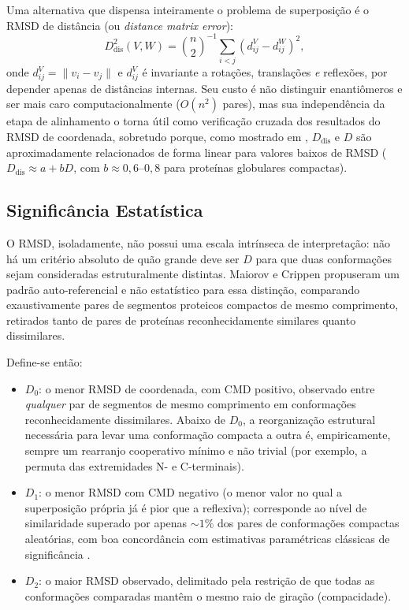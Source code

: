 \documentclass[12pt, a4paper]{article}
\theoremstyle{plain}
\theoremstyle{definition}
\theoremstyle{remark}
\newcommand{\ident}{\hspace{2em}}
\begin{document}
\ident Uma alternativa que dispensa inteiramente o problema de superposição é o RMSD de distância (ou \emph{distance matrix error}):
\begin{equation*}
    D_{\mathrm{dis}}^2(V,W) = \binom{n}{2}^{-1}\sum_{i<j}\left(d^{V}_{ij}-d^{W}_{ij}\right)^2,
\end{equation*}
onde $d^{V}_{ij}=\|v_i-v_j\|$ e $d^V_{ij}$ é invariante a rotações,
translações \emph{e} reflexões, por depender apenas de distâncias internas.
Seu custo é não distinguir enantiômeros e ser mais caro computacionalmente
($O(n^2)$ pares), mas sua independência da etapa de alinhamento o torna útil
como verificação cruzada dos resultados do RMSD de coordenada, sobretudo
porque, como mostrado em \cite{maiorov1994}, $D_{\mathrm{dis}}$ e $D$ são
aproximadamente relacionados de forma linear para valores baixos de RMSD
($D_{\mathrm{dis}} \approx a + bD$, com $b\approx 0{,}6$--$0{,}8$ para
proteínas globulares compactas).

\subsection{Significância Estatística}

\ident O RMSD, isoladamente, não possui uma escala intrínseca de interpretação:
não há um critério absoluto de quão grande deve ser $D$ para que duas
conformações sejam consideradas estruturalmente distintas. Maiorov e Crippen
\cite{maiorov1994} propuseram um padrão auto-referencial e não
estatístico para essa distinção, comparando exaustivamente pares de
segmentos proteicos compactos de mesmo comprimento, retirados tanto de pares
de proteínas reconhecidamente similares quanto dissimilares.

\ident Define-se então:
\begin{itemize}
    \item $D_0$: o menor RMSD de coordenada, com CMD positivo, observado
    entre \emph{qualquer} par de segmentos de mesmo comprimento em
    conformações reconhecidamente dissimilares. Abaixo de $D_0$, a
    reorganização estrutural necessária para levar uma conformação compacta
    a outra é, empiricamente, sempre um rearranjo cooperativo mínimo e não
    trivial (por exemplo, a permuta das extremidades N- e C-terminais).
    \item $D_1$: o menor RMSD com CMD negativo (o menor valor no qual a
    superposição própria já é pior que a reflexiva); corresponde ao nível de
    similaridade superado por apenas $\sim 1\%$ dos pares de conformações
    compactas aleatórias, com boa concordância com estimativas paramétricas
    clássicas de significância \cite{aleksandrov1992}.
    \item $D_2$: o maior RMSD observado, delimitado pela restrição de que
    todas as conformações comparadas mantêm o mesmo raio de giração
    (compacidade).
\end{itemize}
\end{document}
